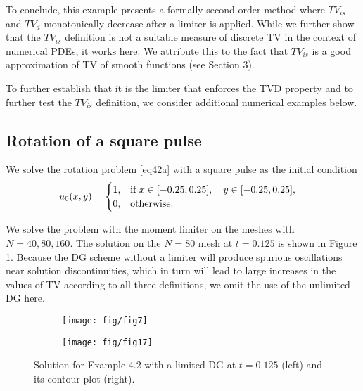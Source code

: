 \documentclass[reqno,a4paper,12pt]{amsart}
\begin{document}
To conclude, this example presents a formally second-order method where $TV_{is}$ and $TV_d$ monotonically decrease after a limiter is applied. While we further show that the $TV_{is}$ definition is not a suitable measure of discrete TV in the context of numerical PDEs, it works here. We attribute this to the fact that $TV_{is}$ is a good approximation of TV of smooth functions (see Section 3). 

To further establish that it is the limiter that enforces the TVD property and to further test the $TV_{is}$ definition, we consider additional numerical examples below.

\subsection{Rotation of a square pulse}


We solve the rotation problem \eqref{eq42a} with a square pulse  as the initial condition
\begin{align}
    &u_0(x,y) = \begin{cases} 1, & \mbox{if } x \in [-0.25 ,0.25 ], \quad y \in [-0.25 ,0.25], \\ 0,  & \mbox{otherwise. } \end{cases} \hfill \label{eq43b}
\end{align}

We solve the problem with the moment limiter on the meshes with $N=40, 80, 160$. The solution on the $N=80$ mesh at $t = 0.125$ is shown in Figure \ref{fig:4}. Because the DG scheme without a limiter will produce spurious oscillations near solution discontinuities, which in turn will lead to large increases in the values of TV according to all three definitions, we omit the use of the unlimited DG here.

\begin{figure}[htb!]
\centering
     \begin{subfigure}[b]{0.45\textwidth}
         \centering
         \texttt{[image: fig/fig7]}
     \end{subfigure} \quad
     \begin{subfigure}[b]{0.45\textwidth}
         \centering
         \texttt{[image: fig/fig17]}
     \end{subfigure}
     \hfill
    
        \caption{Solution for Example 4.2 with a limited DG at $t = 0.125$ (left) and its contour plot (right).}
        \label{fig:4}
\end{figure}
\end{document}
